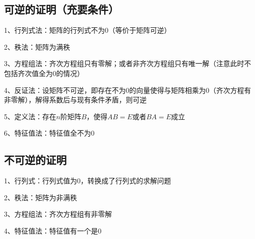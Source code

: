 \subsection{可逆的证明（充要条件）}

1、行列式法：矩阵的行列式不为0（等价于矩阵可逆）

2、秩法：矩阵为满秩

3、方程组法：齐次方程组只有零解；或者非齐次方程组只有唯一解（注意此时不包括齐次值全为0的情况）

4、反证法：设矩阵不可逆，即存在不为0的向量使得与矩阵相乘为0（齐次方程有非零解），解得系数后与现有条件矛盾，则可逆

5、定义法：存在$n$阶矩阵$B$，使得$AB=E$或者$BA=E$成立

6、特征值法：特征值全不为0



\subsection{不可逆的证明}

1、行列式：行列式值为0，转换成了行列式的求解问题

2、秩法：矩阵为非满秩

3、方程组法：齐次方程组有非零解

4、特征值法：特征值有一个是0

